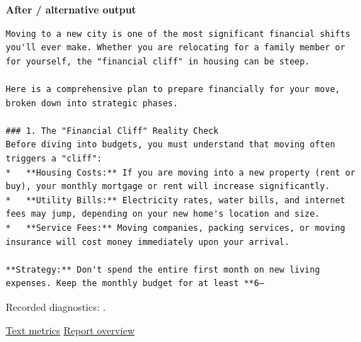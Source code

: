 \textbf{After / alternative output}

\begin{Verbatim}
Moving to a new city is one of the most significant financial shifts you'll ever make. Whether you are relocating for a family member or for yourself, the "financial cliff" in housing can be steep.

Here is a comprehensive plan to prepare financially for your move, broken down into strategic phases.

### 1. The "Financial Cliff" Reality Check
Before diving into budgets, you must understand that moving often triggers a "cliff":
*   **Housing Costs:** If you are moving into a new property (rent or buy), your monthly mortgage or rent will increase significantly.
*   **Utility Bills:** Electricity rates, water bills, and internet fees may jump, depending on your new home's location and size.
*   **Service Fees:** Moving companies, packing services, or moving insurance will cost money immediately upon your arrival.

**Strategy:** Don't spend the entire first month on new living expenses. Keep the monthly budget for at least **6–
\end{Verbatim}

Recorded diagnostics:
\texttt{}.

\href{records/docs/watermarking/text.tex}{Text metrics} \textbar{}
\href{../docs/watermarking/README.md}{Report overview}
